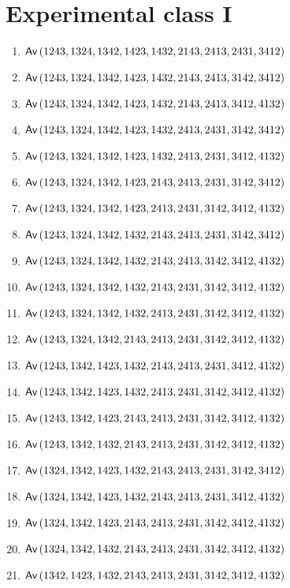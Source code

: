 \label{ch:expcls}

\section{Experimental class I}
\begin{enumerate}
\item $\textsf{Av}\left(1243,1324,1342,1423,1432,2143,2413,2431,3412\right)$
\item $\textsf{Av}\left(1243,1324,1342,1423,1432,2143,2413,3142,3412\right)$
\item $\textsf{Av}\left(1243,1324,1342,1423,1432,2143,2413,3412,4132\right)$
\item $\textsf{Av}\left(1243,1324,1342,1423,1432,2413,2431,3142,3412\right)$
\item $\textsf{Av}\left(1243,1324,1342,1423,1432,2413,2431,3412,4132\right)$
\item $\textsf{Av}\left(1243,1324,1342,1423,2143,2413,2431,3142,3412\right)$
\item $\textsf{Av}\left(1243,1324,1342,1423,2413,2431,3142,3412,4132\right)$
\item $\textsf{Av}\left(1243,1324,1342,1432,2143,2413,2431,3142,3412\right)$
\item $\textsf{Av}\left(1243,1324,1342,1432,2143,2413,3142,3412,4132\right)$
\item $\textsf{Av}\left(1243,1324,1342,1432,2143,2431,3142,3412,4132\right)$
\item $\textsf{Av}\left(1243,1324,1342,1432,2413,2431,3142,3412,4132\right)$
\item $\textsf{Av}\left(1243,1324,1342,2143,2413,2431,3142,3412,4132\right)$
\item $\textsf{Av}\left(1243,1342,1423,1432,2143,2413,2431,3412,4132\right)$
\item $\textsf{Av}\left(1243,1342,1423,1432,2413,2431,3142,3412,4132\right)$
\item $\textsf{Av}\left(1243,1342,1423,2143,2413,2431,3142,3412,4132\right)$
\item $\textsf{Av}\left(1243,1342,1432,2143,2413,2431,3142,3412,4132\right)$
\item $\textsf{Av}\left(1324,1342,1423,1432,2143,2413,2431,3142,3412\right)$
\item $\textsf{Av}\left(1324,1342,1423,1432,2143,2413,2431,3412,4132\right)$
\item $\textsf{Av}\left(1324,1342,1423,2143,2413,2431,3142,3412,4132\right)$
\item $\textsf{Av}\left(1324,1342,1432,2143,2413,2431,3142,3412,4132\right)$
\item $\textsf{Av}\left(1342,1423,1432,2143,2413,2431,3142,3412,4132\right)$
\end{enumerate}

